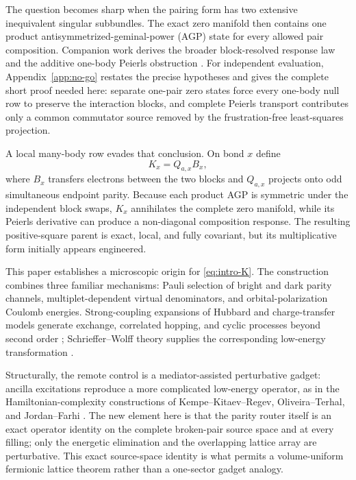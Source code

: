 \documentclass[11pt]{article}
\theoremstyle{definition}
\theoremstyle{remark}
\begin{document}
The question becomes sharp when the pairing form has two extensive inequivalent singular subbundles.  The exact zero manifold then contains one product antisymmetrized-geminal-power (AGP) state for every allowed pair composition.  Companion work derives the broader block-resolved response law and the additive one-body Peierls obstruction \cite{SledgianowskiMultiBlock,SledgianowskiNoGo}.  For independent evaluation, Appendix~\ref{app:no-go} restates the precise hypotheses and gives the complete short proof needed here: separate one-pair zero states force every one-body null row to preserve the interaction blocks, and complete Peierls transport contributes only a common commutator source removed by the frustration-free least-squares projection.

A local many-body row evades that conclusion.  On bond $x$ define
\begin{equation}
 K_x=Q_{a,x}B_x,
 \label{eq:intro-K}
\end{equation}
where $B_x$ transfers electrons between the two blocks and $Q_{a,x}$ projects onto odd simultaneous endpoint parity.  Because each product AGP is symmetric under the independent block swaps, $K_x$ annihilates the complete zero manifold, while its Peierls derivative can produce a non-diagonal composition response.  The resulting positive-square parent is exact, local, and fully covariant, but its multiplicative form initially appears engineered.

This paper establishes a microscopic origin for \eqref{eq:intro-K}.  The construction combines three familiar mechanisms: Pauli selection of bright and dark parity channels, multiplet-dependent virtual denominators, and orbital-polarization Coulomb energies.  Strong-coupling expansions of Hubbard and charge-transfer models generate exchange, correlated hopping, and cyclic processes beyond second order \cite{MacDonald1988,Aligia2018}; Schrieffer--Wolff theory supplies the corresponding low-energy transformation \cite{Schrieffer1966,Bravyi2011}.

Structurally, the remote control is a mediator-assisted perturbative gadget: ancilla excitations reproduce a more complicated low-energy operator, as in the Hamiltonian-complexity constructions of Kempe--Kitaev--Regev, Oliveira--Terhal, and Jordan--Farhi \cite{Kempe2006,Oliveira2008,Jordan2008}.  The new element here is that the parity router itself is an exact operator identity on the complete broken-pair source space and at every filling; only the energetic elimination and the overlapping lattice array are perturbative.  This exact source-space identity is what permits a volume-uniform fermionic lattice theorem rather than a one-sector gadget analogy.
\end{document}
